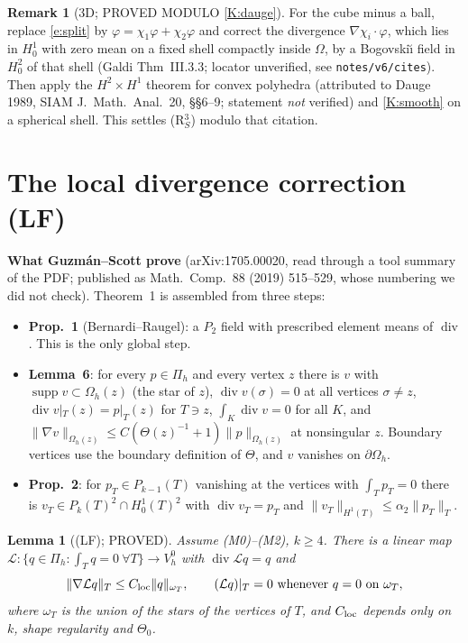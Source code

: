 \documentclass[11pt,reqno]{amsart}
\theoremstyle{plain}
\newtheorem{lemma}[theorem]{Lemma}
\theoremstyle{definition}
\newtheorem{remark}[theorem]{Remark}
\newcommand{\VO}{V_h^0}
\newcommand{\Pih}{\Pi_h}
\newcommand{\norm}[1]{\lVert #1\rVert}
\renewcommand{\div}{\operatorname{div}}
\DeclareMathOperator{\supp}{supp}
\begin{document}
\begin{remark}[3D; PROVED MODULO \ref{K:dauge}]\label{r:3d}
For the cube minus a ball, replace \eqref{e:split} by $\varphi=\chi_1\varphi+\chi_2\varphi$ and correct the divergence $\nabla\chi_i\cdot\varphi$, which lies in $H^1_0$ with zero mean on a fixed shell compactly inside $\Omega$, by a Bogovski\u\i{} field in $H^2_0$ of that shell (Galdi Thm~III.3.3; locator unverified, see \texttt{notes/v6/cites}). Then apply the $H^2\times H^1$ theorem for convex polyhedra (attributed to Dauge 1989, SIAM J.\ Math.\ Anal.\ 20, \S\S 6--9; statement \emph{not} verified) and \ref{K:smooth} on a spherical shell. This settles (R$_S^3$) modulo that citation.
\end{remark}

\section{The local divergence correction (LF)}\label{s:LF}

\noindent\textbf{What Guzm\'an--Scott prove} (arXiv:1705.00020, read through a tool summary of the PDF; published as Math.\ Comp.\ 88 (2019) 515--529, whose numbering we did not check). Theorem~1 is assembled from three steps:
\begin{itemize}
\item \textbf{Prop.~1} (Bernardi--Raugel): a $P_2$ field with prescribed element means of $\div$. This is the only global step.
\item \textbf{Lemma~6}: for every $p\in\Pih$ and every vertex $z$ there is $v$ with $\supp v\subset\Omega_h(z)$ (the star of $z$), $\div v(\sigma)=0$ at all vertices $\sigma\ne z$, $\div v|_T(z)=p|_T(z)$ for $T\ni z$, $\int_K\div v=0$ for all $K$, and $\norm{\nabla v}_{\Omega_h(z)}\le C(\Theta(z)^{-1}+1)\norm p_{\Omega_h(z)}$ at nonsingular $z$. Boundary vertices use the boundary definition of $\Theta$, and $v$ vanishes on $\partial\Omega_h$.
\item \textbf{Prop.~2}: for $p_T\in P_{k-1}(T)$ vanishing at the vertices with $\int_Tp_T=0$ there is $v_T\in P_k(T)^2\cap H^1_0(T)^2$ with $\div v_T=p_T$ and $\norm{v_T}_{H^1(T)}\le\alpha_2\norm{p_T}_T$.
\end{itemize}

\begin{lemma}[(LF); PROVED]\label{l:LF}
Assume (M0)--(M2), $k\ge4$. There is a linear map $\mathcal L:\{q\in\Pih:\int_Tq=0\ \forall T\}\to\VO$ with $\div\mathcal Lq=q$ and
\[
\norm{\nabla\mathcal Lq}_T\le C_{\rm loc}\norm q_{\omega_T},\qquad (\mathcal Lq)|_T=0\ \text{whenever } q=0 \text{ on }\omega_T,
\]
where $\omega_T$ is the union of the stars of the vertices of $T$, and $C_{\rm loc}$ depends only on $k$, shape regularity and $\Theta_0$.
\end{lemma}
\end{document}
